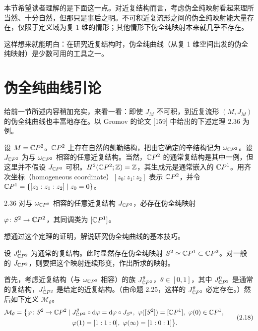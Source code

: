 本节希望读者理解的是下面这一点。对近复结构而言，考虑伪全纯映射看起来理所当然、十分自然，但那只是事后之明。不可积近复流形之间的伪全纯映射能大量存在，仅限于定义域为复 1 维的情形；其他情形下伪全纯映射本来就几乎不存在。

这样想来就能明白：在研究近复结构时，伪全纯曲线（从复 1 维空间出发的伪全纯映射）是少数可用的工具之一。

\section{伪全纯曲线引论}


给前一节所述内容稍加充实，来看一看：即使 $J_M$ 不可积，到近复流形 $(M,J_M)$ 的伪全纯曲线也丰富地存在。以 Gromov 的论文 [159] 中给出的下述定理 2.36 为例。

设 $M=\mathbb{C}P^2$。$\mathbb{C}P^2$ 上存在自然的凯勒结构，把由它确定的辛结构记为 $\omega_{\mathbb{C}P^2}$。设 $J_{\mathbb{C}P^2}$ 为与 $\omega_{\mathbb{C}P^2}$ 相容的任意近复结构。当然，$\mathbb{C}P^2$ 的通常复结构是其中一例，但这里并不假设 $J_{\mathbb{C}P^2}$ 可积。$H^2(\mathbb{C}P^2;\mathbb{Z})=\mathbb{Z}$，其生成元是通常嵌入的 $\mathbb{C}P^1$。用齐次坐标（homogeneous coordinate）$[z_0:z_1:z_2]$ 表示 $\mathbb{C}P^2$，并令 $\mathbb{C}P^1=\{[z_0:z_1:z_2]\mid z_0=0\}$。

\begin{theorem}{2.36}
  对与 $\omega_{\mathbb{C}P^2}$ 相容的任意近复结构 $J_{\mathbb{C}P^2}$，必存在伪全纯映射

  $\varphi\colon S^2\to\mathbb{C}P^2$，其同调类为 $[\mathbb{C}P^1]$。
\end{theorem}

想通过这个定理的证明，解说研究伪全纯曲线的基本技巧。

设 $J^0_{\mathbb{C}P^2}$ 为通常的复结构。此时显然存在伪全纯映射 $S^2\simeq\mathbb{C}P^1\subset\mathbb{C}P^2$。对一般的 $J_{\mathbb{C}P^2}$，则要把这个映射连续形变，作出所求的映射。

首先，考虑近复结构（与 $\omega_{\mathbb{C}P^2}$ 相容）的族 $J^\theta_{\mathbb{C}P^2}$，$\theta\in[0,1]$，其中 $J^0_{\mathbb{C}P^2}$ 是通常的复结构，$J^1_{\mathbb{C}P^2}$ 是给定的近复结构。（由命题 2.25，这样的 $J^\theta_{\mathbb{C}P^2}$ 必定存在。）然后如下定义 $\mathcal{M}_\theta$。
\begin{equation}
  \begin{aligned}
    \mathcal{M}_\theta=\bigl\{\varphi\colon S^2\to\mathbb{C}P^2\mid{}&J^\theta_{\mathbb{C}P^2}\circ\mathrm{d}\varphi=\mathrm{d}\varphi\circ J_{S^2},\ \varphi([S^2])=[\mathbb{C}P^1],\ \varphi(0)\in\mathbb{C}P^1,\\
    &\varphi(1)=[1:1:0],\ \varphi(\infty)=[1:0:1]\bigr\}.
  \end{aligned} \tag{2.18}
\end{equation}


